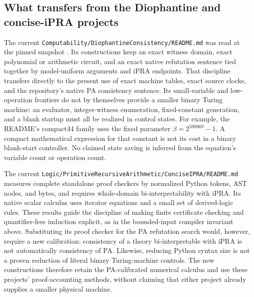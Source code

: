 \subsection{What transfers from the Diophantine and concise-iPRA projects}

The current \texttt{Computability/DiophantineConsistency/README.md}
was read at the pinned snapshot \cite{diophantine}.  Its constructions keep an exact witness
domain, exact polynomial or arithmetic circuit, and an exact native
refutation sentence tied together by model-uniform arguments and iPRA
endpoints.  That discipline transfers directly to the present use of exact
machine tables, exact source clocks, and the repository's native PA
consistency sentence.  Its small-variable and low-operation frontiers do
not by themselves provide a smaller binary Turing machine: an evaluator,
integer-witness enumeration, fixed-constant generation, and a blank startup
must all be realized in control states.  For example, the README's
compact44 family uses the fixed parameter $\beta=2^{590069}-1$.
A compact mathematical expression for that constant is not its cost in a
binary blank-start controller.  No claimed state saving is inferred from
the equation's variable count or operation count.

The current \texttt{Logic/PrimitiveRecursiveArithmetic/ConciseIPRA/README.md}
\cite{concise} measures complete standalone proof checkers by normalized Python tokens,
AST nodes, and bytes, and requires whole-domain bi-interpretability with
iPRA.  Its native scalar calculus uses iterator equations and a small
set of derived-logic rules.  These results guide the discipline of making
finite certificate checking and quantifier-free induction explicit, as in
the bounded-input compiler invariant above.  Substituting its proof checker
for the PA refutation search would, however, require a new calibration:
consistency of a theory bi-interpretable with iPRA is not automatically
consistency of PA.  Likewise, reducing Python syntax size is not a proven
reduction of literal binary Turing-machine controls.  The new constructions
therefore retain the PA-calibrated numerical calculus and use these
projects' proof-accounting methods, without claiming that either project
already supplies a smaller physical machine.
